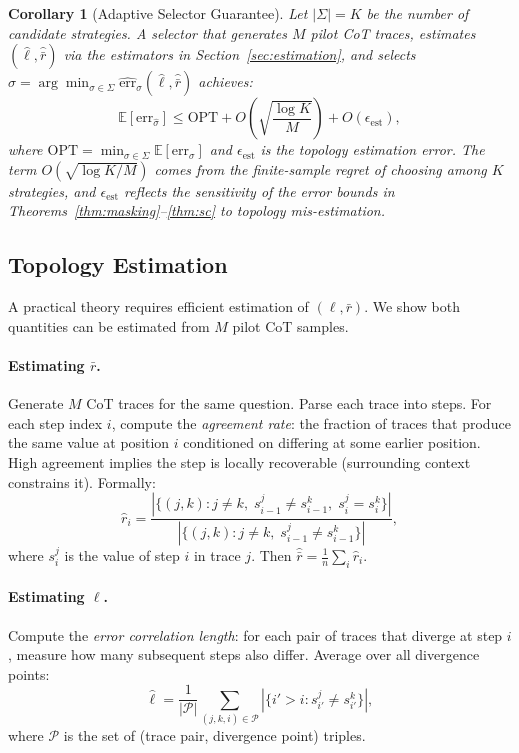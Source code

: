 \documentclass{article}
\newtheorem{corollary}[theorem]{Corollary}
\begin{document}
\begin{corollary}[Adaptive Selector Guarantee]
\label{cor:adaptive}
Let $|\Sigma| = K$ be the number of candidate strategies. A selector that generates $M$ pilot CoT traces, estimates $(\hat{\ell}, \hat{\bar{r}})$ via the estimators in Section~\ref{sec:estimation}, and selects $\hat{\sigma} = \arg\min_{\sigma \in \Sigma} \widehat{\text{err}}_\sigma(\hat{\ell}, \hat{\bar{r}})$ achieves:
\begin{equation}
\mathbb{E}[\text{err}_{\hat{\sigma}}] \leq \text{OPT} + O\!\left(\sqrt{\frac{\log K}{M}}\right) + O(\epsilon_{\text{est}}),
\end{equation}
where $\text{OPT} = \min_{\sigma \in \Sigma} \mathbb{E}[\text{err}_\sigma]$ and $\epsilon_{\text{est}}$ is the topology estimation error. The term $O(\sqrt{\log K / M})$ comes from the finite-sample regret of choosing among $K$ strategies, and $\epsilon_{\text{est}}$ reflects the sensitivity of the error bounds in Theorems~\ref{thm:masking}--\ref{thm:sc} to topology mis-estimation.
\end{corollary}

\subsection{Topology Estimation}

A practical theory requires efficient estimation of $(\ell, \bar{r})$. We show both quantities can be estimated from $M$ pilot CoT samples.

\paragraph{Estimating $\bar{r}$.} Generate $M$ CoT traces for the same question. Parse each trace into steps. For each step index $i$, compute the \emph{agreement rate}: the fraction of traces that produce the same value at position $i$ conditioned on differing at some earlier position. High agreement implies the step is locally recoverable (surrounding context constrains it). Formally:
\begin{equation}
\hat{r}_i = \frac{|\{(j,k) : j \neq k,\; s^j_{i-1} \neq s^k_{i-1},\; s^j_i = s^k_i\}|}{|\{(j,k) : j \neq k,\; s^j_{i-1} \neq s^k_{i-1}\}|},
\end{equation}
where $s^j_i$ is the value of step $i$ in trace $j$. Then $\hat{\bar{r}} = \frac{1}{n}\sum_i \hat{r}_i$.

\paragraph{Estimating $\ell$.} Compute the \emph{error correlation length}: for each pair of traces that diverge at step $i$, measure how many subsequent steps also differ. Average over all divergence points:
\begin{equation}
\hat{\ell} = \frac{1}{|\mathcal{P}|}\sum_{(j,k,i) \in \mathcal{P}} |\{i' > i : s^j_{i'} \neq s^k_{i'}\}|,
\end{equation}
where $\mathcal{P}$ is the set of (trace pair, divergence point) triples.
\end{document}
